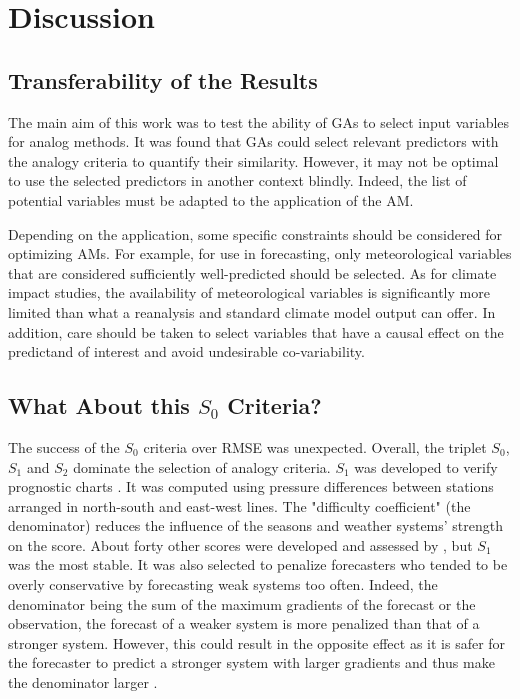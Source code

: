 \documentclass[draft]{agujournal2019}
\begin{document}
\section{Discussion}
\label{discussion}


\subsection{Transferability of the Results}
\label{transferability}

The main aim of this work was to test the ability of GAs to select input variables for analog methods. It was found that GAs could select relevant predictors with the analogy criteria to quantify their similarity. However, it may not be optimal to use the selected predictors in another context blindly. Indeed, the list of potential variables must be adapted to the application of the AM.

Depending on the application, some specific constraints should be considered for optimizing AMs. For example, for use in forecasting, only meteorological variables that are considered sufficiently well-predicted should be selected. As for climate impact studies, the availability of meteorological variables is significantly more limited than what a reanalysis and standard climate model output can offer. In addition, care should be taken to select variables that have a causal effect on the predictand of interest and avoid undesirable co-variability.


\subsection{What About this $S_{0}$ Criteria?}
\label{discussion_S0}

The success of the $S_{0}$ criteria over RMSE was unexpected. Overall, the triplet $S_{0}$, $S_{1}$ and $S_{2}$ dominate the selection of analogy criteria. $S_{1}$ was developed to verify prognostic charts \cite{Teweles1954}. It was computed using pressure differences between stations arranged in north-south and east-west lines. The "difficulty coefficient" (the denominator) reduces the influence of the seasons and weather systems' strength on the score. About forty other scores were developed and assessed by , but $S_{1}$ was the most stable. It was also selected to penalize forecasters who tended to be overly conservative by forecasting weak systems too often. Indeed, the denominator being the sum of the maximum gradients of the forecast or the observation, the forecast of a weaker system is more penalized than that of a stronger system. However, this could result in the opposite effect as it is safer for the forecaster to predict a stronger system with larger gradients and thus make the denominator larger \cite{Thompson1972}.
\end{document}
